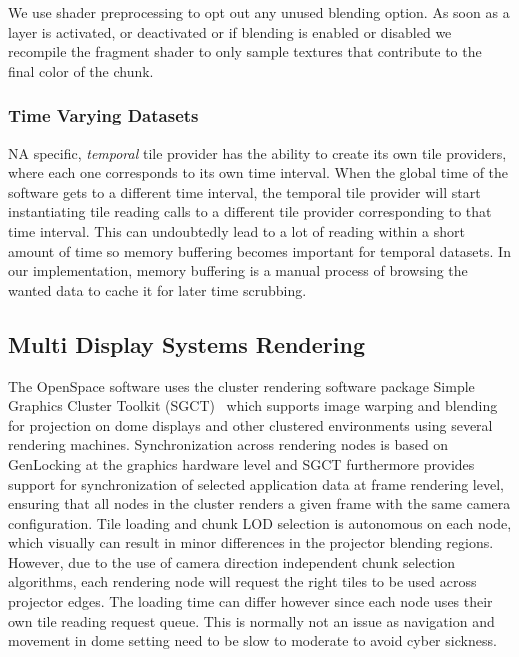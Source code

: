 \documentclass[journal]{vgtc}                %
\begin{document}
We use shader preprocessing to opt out any unused blending option.
As soon as a layer is activated, or deactivated or if blending is enabled or disabled we recompile the fragment shader to only sample textures that contribute to the final color of the chunk.

\subsubsection{Time Varying Datasets}

NA specific, \emph{temporal} tile provider has the ability to create its own tile providers, where each one corresponds to its own time interval.
When the global time of the software gets to a different time interval, the temporal tile provider will start instantiating tile reading calls to a different tile provider corresponding to that time interval.
This can undoubtedly lead to a lot of reading within a short amount of time so memory buffering becomes important for temporal datasets.
In our implementation, memory buffering is a manual process of browsing the wanted data to cache it for later time scrubbing.

\subsection{Multi Display Systems Rendering} \label{sec:multidisplaysystems}

The OpenSpace software uses the cluster rendering software package Simple Graphics Cluster Toolkit (SGCT)~\cite{sgct} which supports image warping and blending for projection on dome displays and other clustered environments using several rendering machines.
Synchronization across rendering nodes is based on GenLocking at the graphics hardware level and SGCT furthermore provides support for synchronization of selected application data at frame rendering level, ensuring that all nodes in the cluster renders a given frame with the same camera configuration.
Tile loading and chunk LOD selection is autonomous on each node, which visually can result in minor differences in the projector blending regions. However, due to the use of camera direction independent chunk selection algorithms, each rendering node will request the right tiles to be used across projector edges. The loading time can differ however since each node uses their own tile reading request queue.
This is normally not an issue as navigation and movement in dome setting need to be slow to moderate to avoid cyber sickness.
\end{document}
